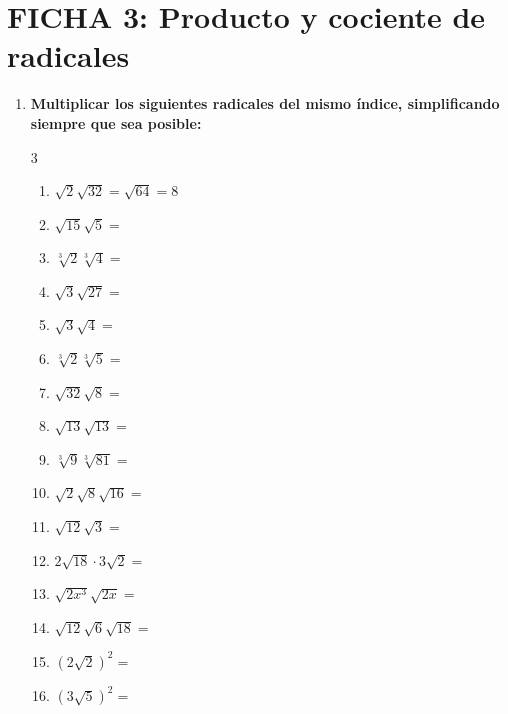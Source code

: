 \documentclass[a4paper,12pt]{article}
\begin{document}
\newpage

\section*{FICHA 3: Producto y cociente de radicales}



\begin{enumerate}
    \item \textbf{Multiplicar los siguientes radicales del mismo índice, simplificando siempre que sea posible:}
    \begin{multicols}{3}
    \begin{enumerate}[label=\alph*)]
        \item $\sqrt{2}\sqrt{32} = \sqrt{64} = 8$
        \item $\sqrt{15}\sqrt{5} =$
        \item $\sqrt[3]{2}\sqrt[3]{4} =$
        \item $\sqrt{3}\sqrt{27} =$
        \item $\sqrt{3}\sqrt{4} =$
        \item $\sqrt[3]{2}\sqrt[3]{5} =$
        \item $\sqrt{32}\sqrt{8} =$
        \item $\sqrt{13}\sqrt{13} =$
        \item $\sqrt[3]{9}\sqrt[3]{81} =$
        \item $\sqrt{2}\sqrt{8}\sqrt{16} =$
        \item $\sqrt{12}\sqrt{3} =$
        \item $2\sqrt{18} \cdot 3\sqrt{2} =$
        \item $\sqrt{2x^3}\sqrt{2x} =$
        \item $\sqrt{12}\sqrt{6}\sqrt{18} =$
        \item $(2\sqrt{2})^2 =$
        \item $(3\sqrt{5})^2 =$
    \end{enumerate}
    \end{multicols}


\end{enumerate}
\end{document}
